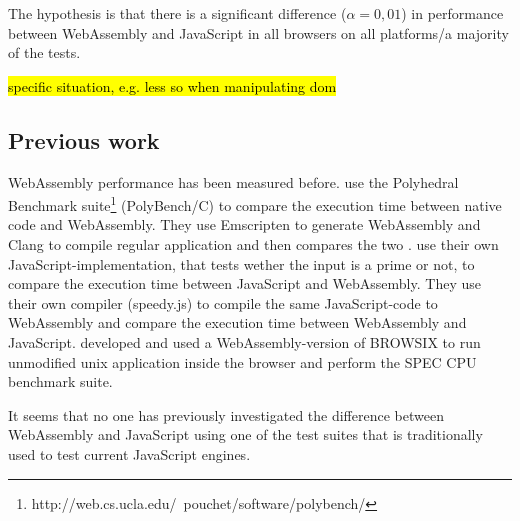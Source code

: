 The hypothesis is that there is a significant difference ($\alpha = 0,01$) in performance between WebAssembly and JavaScript in all browsers on all platforms/a majority of the tests.

\hl{specific situation, e.g. less so when manipulating dom}

\subsection{Previous work}

WebAssembly performance has been measured before. \textcite{HaasRossbergSchuffTitzerHolmanGohmanWagnerZakaiBastien2017} use the Polyhedral Benchmark suite\footnote{http://web.cs.ucla.edu/~pouchet/software/polybench/} (PolyBench/C) to compare the execution time between native code and WebAssembly. They use Emscripten to generate WebAssembly and Clang \parencite{LattnerAdve2014} to compile regular application and then compares the two \parencite{HaasRossbergSchuffTitzerHolmanGohmanWagnerZakaiBastien2017}. \textcite{ReiserBlaser2017} use their own JavaScript-implementation, that tests wether the input is a prime or not, to compare the execution time between JavaScript and WebAssembly. They use their own compiler (speedy.js) to compile the same JavaScript-code to WebAssembly and compare the execution time between WebAssembly and JavaScript. \textcite{JangdaPowersGuhaBerger2019} developed and used a WebAssembly-version of BROWSIX to run unmodified unix application inside the browser and perform the SPEC CPU benchmark suite.

It seems that no one has previously investigated the difference between WebAssembly and JavaScript using one of the test suites that is traditionally used to test current JavaScript engines.

